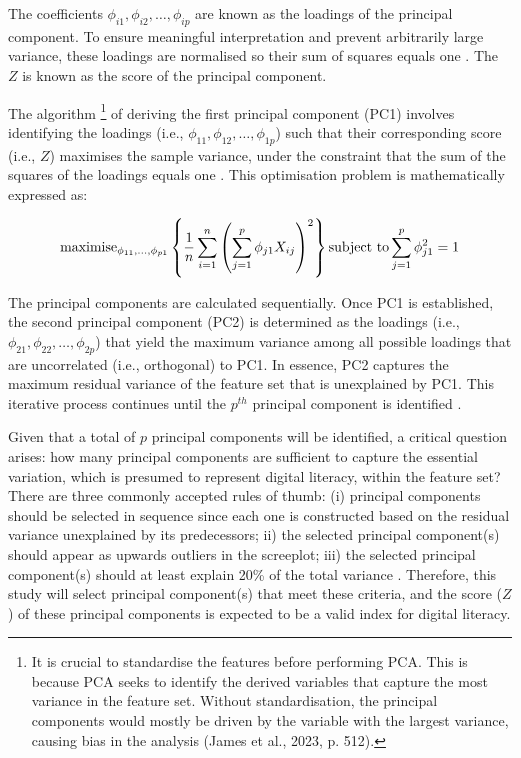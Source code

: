 The coefficients $\phi_{i1}, \phi_{i2}, \ldots, \phi_{ip}$ are known as the loadings of the principal component. To ensure meaningful interpretation and prevent arbitrarily large variance, these loadings are normalised so their sum of squares equals one \parencite[p. 505]{james_introduction_2023}. The $Z$ is known as the score of the principal component.

The algorithm \footnote{It is crucial to standardise the features before performing PCA. This is because PCA seeks to identify the derived variables that capture the most variance in the feature set. Without standardisation, the principal components would mostly be driven by the variable with the largest variance, causing bias in the analysis (James et al., 2023, p. 512).} of deriving the first principal component (PC1) involves identifying the loadings (i.e., $\phi_{11}, \phi_{12}, \ldots, \phi_{1p}$) such that their corresponding score (i.e., $Z$) maximises the sample variance, under the constraint that the sum of the squares of the loadings equals one \parencite[p. 506]{james_introduction_2023}. This optimisation problem is mathematically expressed as: 

\begin{equation}
    \label{eq:pca_algorithm}
    \textnormal{maximise}_{\phi_{11}, \ldots, \phi_{p1}} \left\{ \frac{1}{n} \sum_{i=1}^{n} \left( \sum_{j=1}^{p} \phi_{j1} X_{ij} \right)^2 \right\} \textnormal{subject to} \sum_{j=1}^{p} \phi_{j1}^2 = 1
\end{equation}

The principal components are calculated sequentially. Once PC1 is established, the second principal component (PC2) is determined as the loadings (i.e., $\phi_{21}, \phi_{22}, \ldots, \phi_{2p}$) that yield the maximum variance among all possible loadings that are uncorrelated (i.e., orthogonal) to PC1. In essence, PC2 captures the maximum residual variance of the feature set that is unexplained by PC1. This iterative process continues until the $p^{th}$ principal component is identified \parencite[p. 507]{james_introduction_2023}.

Given that a total of $p$ principal components will be identified, a critical question arises: how many principal components are sufficient to capture the essential variation, which is presumed to represent digital literacy, within the feature set? There are three commonly accepted rules of thumb: (i) principal components should be selected in sequence since each one is constructed based on the residual variance unexplained by its predecessors; ii) the selected principal component(s) should appear as upwards outliers in the screeplot; iii) the selected principal component(s) should at least explain 20\% of the total variance \parencite[p. 212]{zelterman_applied_2015}. Therefore, this study will select principal component(s) that meet these criteria, and the score ($Z$) of these principal components is expected to be a valid index for digital literacy.

